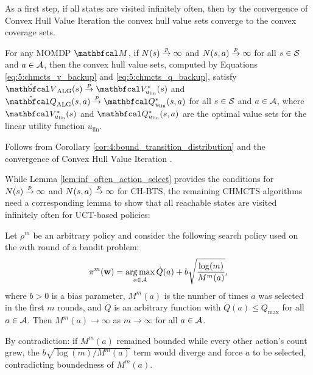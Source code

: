     As a first step, if all states are visited infinitely often, then by the convergence of Convex Hull Value Iteration \cite{chvi} the convex hull value sets converge to the convex coverage sets. 
    \begin{theorem}
        \label{thrm:5:chmcts}
        For any MOMDP $\bfcl{M}$, if $N(s)\overset{p}{\to}\infty$ and $N(s,a)\overset{p}{\to}\infty$ for all $s\in\mathcal{S}$ and $a\in\mathcal{A}$, then the convex hull value sets, computed by Equations \eqref{eq:5:chmcts_v_backup} and \eqref{eq:5:chmcts_q_backup}, satisfy $\Valg(s)\rap\bfcl{V}^*_{u_{\text{lin}}}(s)$ and $\Qalg(s,a)\rap\bfcl{Q}^*_{u_{\text{lin}}}(s,a)$ for all $s\in\mathcal{S}$ and $a\in\mathcal{A}$, where $\bfcl{V}^*_{u_{\text{lin}}}(s)$ and $\bfcl{Q}^*_{u_{\text{lin}}}(s,a)$ are the optimal value sets for the linear utility function $u_{\text{lin}}$.
    \end{theorem}
    \begin{proofoutline}
        Follows from Corollary \mbox{\ref{cor:4:bound_transition_distribution}} and the convergence of Convex Hull Value Iteration \cite{chvi}.
    \end{proofoutline}

    While Lemma \ref{lem:inf_often_action_select} provides the conditions for $N(s)\overset{p}{\to}\infty$ and $N(s,a)\overset{p}{\to}\infty$ for CH-BTS, the remaining CHMCTS algorithms need a corresponding lemma to show that all reachable states are visited infinitely often for UCT-based policies:
    \begin{lemma} 
        \label{lem:inf_often_action_select_uct}
        Let $\rho^m$ be an arbitrary policy and consider the following search policy used on the $m$th round of a bandit problem:
        \begin{align} 
            \pi^m(\mathbf{w}) = \operatorname*{arg\,max}_{a\in\mathcal{A}} \dot{Q}(a) + b \sqrt{\frac{\log(m)}{M^m(a)}},
        \end{align}
        where $b > 0$ is a bias parameter, $M^m(a)$ is the number of times $a$ was selected in the first $m$ rounds, and $\dot{Q}$ is an arbitrary function with $\dot{Q}(a) \leq Q_{\max}$ for all $a\in\mathcal{A}$. Then $M^m(a)\rightarrow\infty$ as $m\rightarrow\infty$ for all $a\in\mathcal{A}$.
    \end{lemma}
    \begin{proofoutline}
        By contradiction: if $M^m(a)$ remained bounded while every other action's count grew, the $b\sqrt{\log(m)/M^m(a)}$ term would diverge and force $a$ to be selected, contradicting boundedness of $M^m(a)$.
    \end{proofoutline}

